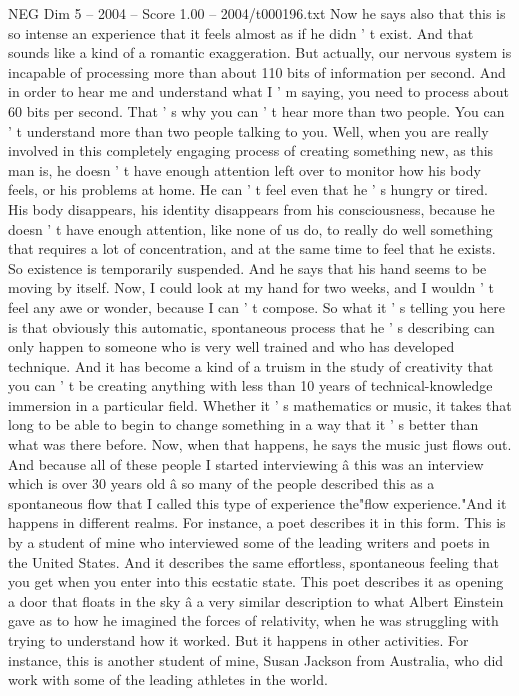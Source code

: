 \begin{textsample}{NEG Dim 5 – 2004 – Score 1.00 – 2004/t000196.txt}
Now he says also that this is so intense an experience that it feels almost as if he didn ' t exist.
And that sounds like a kind of a romantic exaggeration.
But actually, our nervous system is incapable of processing more than about 110 bits of information per second.
And in order to hear me and understand what I ' m saying, you need to process about 60 bits per second.
That ' s why you can ' t hear more than two people.
You can ' t understand more than two people talking to you.
Well, when you are really involved in this completely engaging process of creating something new, as this man is, he doesn ' t have enough attention left over to monitor how his body feels, or his problems at home.
He can ' t feel even that he ' s hungry or tired.
His body disappears, his identity disappears from his consciousness, because he doesn ' t have enough attention, like none of us do, to really do well something that requires a lot of concentration, and at the same time to feel that he exists.
So existence is temporarily suspended.
And he says that his hand seems to be moving by itself.
Now, I could look at my hand for two weeks, and I wouldn ' t feel any awe or wonder, because I can ' t compose.
So what it ' s telling you here is that obviously this automatic, spontaneous process that he ' s describing can only happen to someone who is very well trained and who has developed technique.
And it has become a kind of a truism in the study of creativity that you can ' t be creating anything with less than 10 years of technical-knowledge immersion in a particular field.
Whether it ' s mathematics or music, it takes that long to be able to begin to change something in a way that it ' s better than what was there before.
Now, when that happens, he says the music just flows out.
And because all of these people I started interviewing â this was an interview which is over 30 years old â so many of the people described this as a spontaneous flow that I called this type of experience the"flow experience."And it happens in different realms.
For instance, a poet describes it in this form.
This is by a student of mine who interviewed some of the leading writers and poets in the United States.
And it describes the same effortless, spontaneous feeling that you get when you enter into this ecstatic state.
This poet describes it as opening a door that floats in the sky â a very similar description to what Albert Einstein gave as to how he imagined the forces of relativity, when he was struggling with trying to understand how it worked.
But it happens in other activities.
For instance, this is another student of mine, Susan Jackson from Australia, who did work with some of the leading athletes in the world.

\end{textsample}
